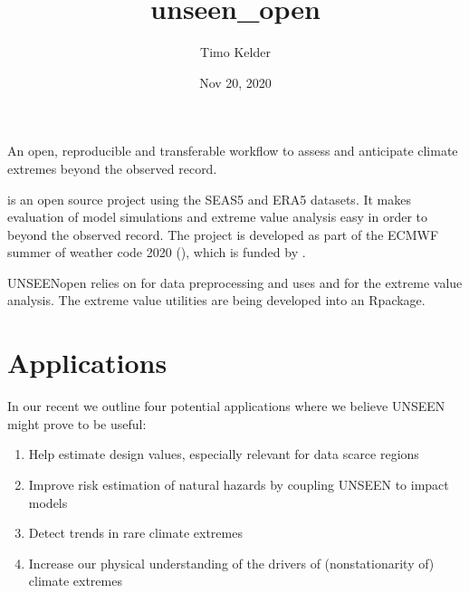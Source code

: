 \documentclass[letterpaper,10pt,english]{sphinxmanual}
\title{unseen\_open}
\date{Nov 20, 2020}
\author{Timo Kelder}
\begin{document}
\pagestyle{empty}
\sphinxmaketitle
\pagestyle{plain}
\sphinxtableofcontents
\pagestyle{normal}
\label{\detokenize{index::doc}}


An open, reproducible and transferable workflow to assess and
anticipate climate extremes beyond the observed record.

 is an open source project using the  SEAS5
and ERA5 datasets. It makes evaluation of model simulations and extreme value analysis
easy in order to  beyond the observed record.
The project is developed as part of the ECMWF summer of weather code 2020 (),
which is funded by .

UNSEEN\sphinxhyphen{}open relies on  for data preprocessing and
uses  and  for the extreme value analysis. The extreme
value utilities are being developed into an  Rpackage.


\chapter{Applications}
\label{\detokenize{index:applications}}
In our recent  we outline four potential
applications where we believe UNSEEN might prove to be useful:
\begin{enumerate}
%
\item {} 
Help estimate design values, especially relevant for data scarce regions

\item {} 
Improve risk estimation of natural hazards by coupling UNSEEN to impact models

\item {} 
Detect trends in rare climate extremes

\item {} 
Increase our physical understanding of the drivers of (non\sphinxhyphen{}stationarity of) climate extremes

\end{enumerate}
\end{document}
